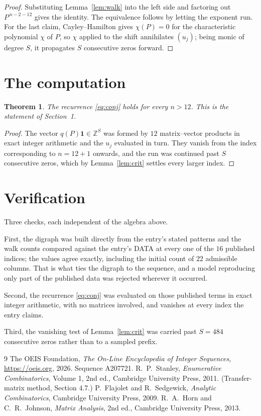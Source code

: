 \documentclass[11pt,a4paper]{article}
\theoremstyle{plain}
\newtheorem{theorem}{Theorem}
\theoremstyle{definition}
\begin{document}
\begin{proof}
Substituting Lemma~\ref{lem:walk} into the left side and factoring out
$P^{\,n-2-12}$ gives the identity. The equivalence follows by letting the exponent
run. For the last claim, Cayley--Hamilton gives $\chi(P)=0$ for the characteristic
polynomial $\chi$ of $P$, so $\chi$ applied to the shift annihilates $(u_j)$; being monic of
degree $S$, it propagates $S$ consecutive zeros forward.
\end{proof}

\section{The computation}

\begin{theorem}
The recurrence \eqref{eq:conj} holds for every $n>12$. This is the statement of
Section~1.
\end{theorem}

\begin{proof}
The vector $q(P)\mathbf{1}\in\mathbb{Z}^{S}$ was formed by $12$ matrix--vector
products in exact integer arithmetic and the $u_j$ evaluated in turn. They vanish from the
index corresponding to $n=12+1$ onwards, and the run was continued past $S$ consecutive
zeros, which by Lemma~\ref{lem:crit} settles every larger index.
\end{proof}

\section{Verification}

Three checks, each independent of the algebra above.

First, the digraph was built directly from the entry's stated patterns and the walk counts
compared against the entry's DATA at every one of the $16$ published indices; the
values agree exactly, including the initial count of $22$ admissible columns. That is
what ties the digraph to the sequence, and a model reproducing only part of the published
data was rejected wherever it occurred.

Second, the recurrence \eqref{eq:conj} was evaluated on those published terms in exact
integer arithmetic, with no matrices involved, and vanishes at every index the entry claims.

Third, the vanishing test of Lemma~\ref{lem:crit} was carried past $S=484$ consecutive
zeros rather than to a sampled prefix.

\begin{thebibliography}{9}
 The OEIS Foundation, \emph{The On-Line Encyclopedia of Integer
Sequences}, \url{https://oeis.org}, 2026. Sequence A207721.
 R.~P.~Stanley, \emph{Enumerative Combinatorics}, Volume 1, 2nd ed.,
Cambridge University Press, 2011. (Transfer-matrix method, Section 4.7.)
 P.~Flajolet and R.~Sedgewick, \emph{Analytic Combinatorics}, Cambridge
University Press, 2009.
 R.~A.~Horn and C.~R.~Johnson, \emph{Matrix Analysis}, 2nd ed., Cambridge
University Press, 2013.
\end{thebibliography}
\end{document}
